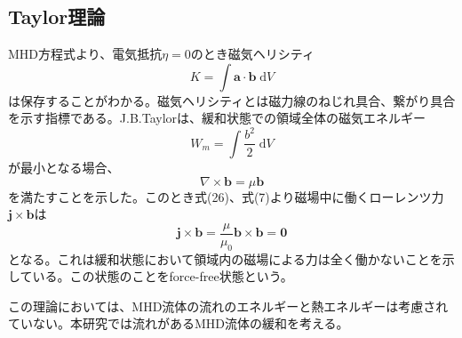 \documentclass[12pt]{jsarticle}
\begin{document}
\subsection{Taylor理論}
MHD方程式より、電気抵抗$\eta=0$のとき磁気ヘリシティ
\begin{equation}
K=\int \bm{a}\cdot\bm{b}\;\mathrm{d}V
\end{equation}
は保存することがわかる。磁気ヘリシティとは磁力線のねじれ具合、繋がり具合を示す指標である。J.B.Taylorは、緩和状態での領域全体の磁気エネルギー
\begin{equation}
W_m=\int \frac{b^2}{2}\;\mathrm{d}V
\end{equation}
が最小となる場合、
\begin{equation}
\nabla\times\bm{b}= \mu\bm{b}
\end{equation}
を満たすことを示した\cite{taylor1974relaxation}\cite{MagnetohydrodynamicsOfPlasmaRelaxation}。このとき式(26)、式(7)より磁場中に働くローレンツ力$\bm{j}\times\bm{b}$は
\begin{equation}
\bm{j}\times\bm{b}= \frac{\mu}{\mu_0}\bm{b}\times\bm{b}=\bm{0}
\end{equation}
となる。これは緩和状態において領域内の磁場による力は全く働かないことを示している。この状態のことをforce-free状態という。

この理論においては、MHD流体の流れのエネルギーと熱エネルギーは考慮されていない。本研究では流れがあるMHD流体の緩和を考える。


\end{document}
